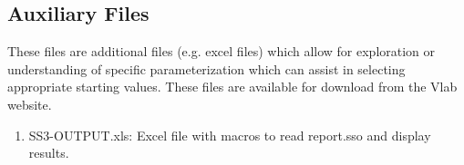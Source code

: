 	\subsection{Auxiliary Files}
	These files are additional files (e.g. excel files) which allow for exploration or understanding of specific parameterization which can assist in selecting appropriate starting values.  These files are available for download from the Vlab website. 
	\begin{enumerate}
		\item SS3-OUTPUT.xls: Excel file with macros to read report.sso and display results.

\end{enumerate}
